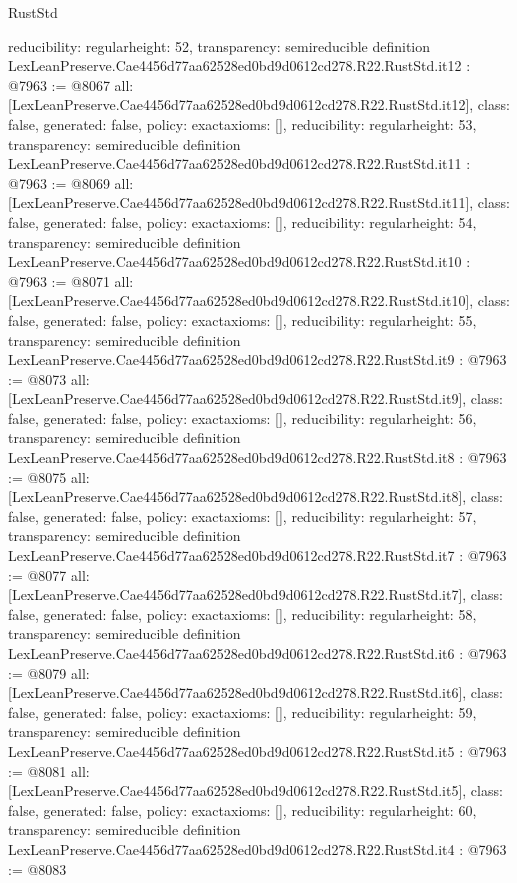 \begin{lexlean}{RustStd}
\begin{coremodule}
{  reducibility: regular{height: 52},
  transparency: semireducible
}
definition LexLeanPreserve.Cae4456d77aa62528ed0bd9d0612cd278.R22.RustStd.it12 : @7963 := @8067 {
  all: [LexLeanPreserve.Cae4456d77aa62528ed0bd9d0612cd278.R22.RustStd.it12],
  class: false,
  generated: false,
  policy: exact{axioms: []},
  reducibility: regular{height: 53},
  transparency: semireducible
}
definition LexLeanPreserve.Cae4456d77aa62528ed0bd9d0612cd278.R22.RustStd.it11 : @7963 := @8069 {
  all: [LexLeanPreserve.Cae4456d77aa62528ed0bd9d0612cd278.R22.RustStd.it11],
  class: false,
  generated: false,
  policy: exact{axioms: []},
  reducibility: regular{height: 54},
  transparency: semireducible
}
definition LexLeanPreserve.Cae4456d77aa62528ed0bd9d0612cd278.R22.RustStd.it10 : @7963 := @8071 {
  all: [LexLeanPreserve.Cae4456d77aa62528ed0bd9d0612cd278.R22.RustStd.it10],
  class: false,
  generated: false,
  policy: exact{axioms: []},
  reducibility: regular{height: 55},
  transparency: semireducible
}
definition LexLeanPreserve.Cae4456d77aa62528ed0bd9d0612cd278.R22.RustStd.it9 : @7963 := @8073 {
  all: [LexLeanPreserve.Cae4456d77aa62528ed0bd9d0612cd278.R22.RustStd.it9],
  class: false,
  generated: false,
  policy: exact{axioms: []},
  reducibility: regular{height: 56},
  transparency: semireducible
}
definition LexLeanPreserve.Cae4456d77aa62528ed0bd9d0612cd278.R22.RustStd.it8 : @7963 := @8075 {
  all: [LexLeanPreserve.Cae4456d77aa62528ed0bd9d0612cd278.R22.RustStd.it8],
  class: false,
  generated: false,
  policy: exact{axioms: []},
  reducibility: regular{height: 57},
  transparency: semireducible
}
definition LexLeanPreserve.Cae4456d77aa62528ed0bd9d0612cd278.R22.RustStd.it7 : @7963 := @8077 {
  all: [LexLeanPreserve.Cae4456d77aa62528ed0bd9d0612cd278.R22.RustStd.it7],
  class: false,
  generated: false,
  policy: exact{axioms: []},
  reducibility: regular{height: 58},
  transparency: semireducible
}
definition LexLeanPreserve.Cae4456d77aa62528ed0bd9d0612cd278.R22.RustStd.it6 : @7963 := @8079 {
  all: [LexLeanPreserve.Cae4456d77aa62528ed0bd9d0612cd278.R22.RustStd.it6],
  class: false,
  generated: false,
  policy: exact{axioms: []},
  reducibility: regular{height: 59},
  transparency: semireducible
}
definition LexLeanPreserve.Cae4456d77aa62528ed0bd9d0612cd278.R22.RustStd.it5 : @7963 := @8081 {
  all: [LexLeanPreserve.Cae4456d77aa62528ed0bd9d0612cd278.R22.RustStd.it5],
  class: false,
  generated: false,
  policy: exact{axioms: []},
  reducibility: regular{height: 60},
  transparency: semireducible
}
definition LexLeanPreserve.Cae4456d77aa62528ed0bd9d0612cd278.R22.RustStd.it4 : @7963 := @8083 {
}
\end{coremodule}
\end{lexlean}
